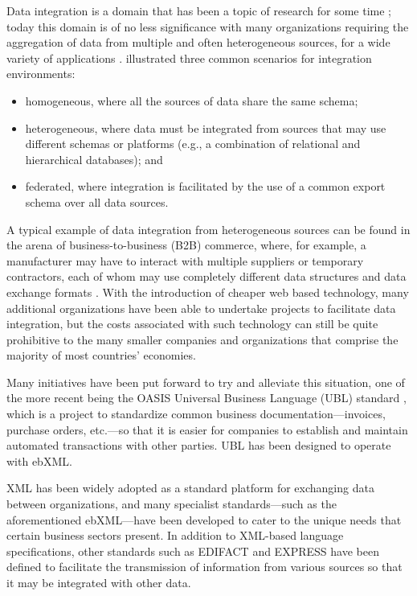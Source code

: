 \documentclass{CRPITStyle}
\begin{document}
Data integration is a domain that has been a topic of research for some
time \cite{Beck-R-2002-Bled,Wied-G-1993-SIGMOD}; today this domain is of
no less significance with many organizations requiring the aggregation
of data from multiple and often heterogeneous sources, for a wide
variety of applications \cite{Haas-LM-1999-DEB}.
 illustrated three common scenarios for
integration environments:

\begin{itemize}

	\item homogeneous, where all the sources of data share the same
	schema;

	\item heterogeneous, where data must be integrated from sources that
	may use different schemas or platforms (e.g., a combination of
	relational and hierarchical databases); and

	\item federated, where integration is facilitated by the use of a
	common export schema over all data sources.

\end{itemize}

A typical example of data integration from heterogeneous sources can be
found in the arena of business-to-business (B2B) commerce, where, for
example, a manufacturer may have to interact with multiple suppliers or
temporary contractors, each of whom may use completely different data
structures and data exchange formats \cite{Ston-M-2001-SIGMOD}. With the
introduction of cheaper web based technology, many additional
organizations have been able to undertake projects to facilitate data
integration, but the costs associated with such technology can still be
quite prohibitive to the many smaller companies and organizations that
comprise the majority of most countries' economies.

Many initiatives have been put forward to try and alleviate this
situation, one of the more recent being the OASIS Universal Business
Language (UBL) standard \cite{Mead-B-2004-UBL}, which is a project to
standardize common business documentation---invoices, purchase orders,
etc.---so that it is easier for companies to establish and maintain
automated transactions with other parties. UBL has been designed to
operate with ebXML.

XML has been widely adopted as a standard platform for exchanging data
between organizations, and many specialist standards---such as the
aforementioned ebXML---have been developed to cater to the unique needs
that certain business sectors present. In addition to XML-based language
specifications, other standards such as EDIFACT and EXPRESS have been
defined to facilitate the transmission of information from various
sources so that it may be integrated with other data.
\end{document}
